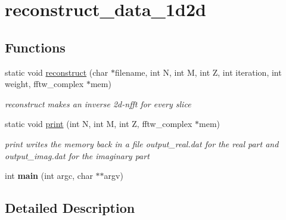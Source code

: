 \hypertarget{group__applications__mri3d__reconstruct__data__1d2d}{\section{reconstruct\-\_\-data\-\_\-1d2d}
\label{group__applications__mri3d__reconstruct__data__1d2d}
}
\subsection*{Functions}
\begin{DoxyCompactItemize}
\item 
\hypertarget{group__applications__mri3d__reconstruct__data__1d2d_gad67335b03b6fec43e0dff3512c8f6d68}{static void \hyperlink{group__applications__mri3d__reconstruct__data__1d2d_gad67335b03b6fec43e0dff3512c8f6d68}{reconstruct} (char $\ast$filename, int N, int M, int Z, int iteration, int weight, fftw\-\_\-complex $\ast$mem)}\label{group__applications__mri3d__reconstruct__data__1d2d_gad67335b03b6fec43e0dff3512c8f6d68}

\begin{DoxyCompactList}\small\item\em reconstruct makes an inverse 2d-\/nfft for every slice \end{DoxyCompactList}\item 
\hypertarget{group__applications__mri3d__reconstruct__data__1d2d_gaa30709aaef018deecdd911083fadb877}{static void \hyperlink{group__applications__mri3d__reconstruct__data__1d2d_gaa30709aaef018deecdd911083fadb877}{print} (int N, int M, int Z, fftw\-\_\-complex $\ast$mem)}\label{group__applications__mri3d__reconstruct__data__1d2d_gaa30709aaef018deecdd911083fadb877}

\begin{DoxyCompactList}\small\item\em print writes the memory back in a file output\-\_\-real.\-dat for the real part and output\-\_\-imag.\-dat for the imaginary part \end{DoxyCompactList}\item 
\hypertarget{group__applications__mri3d__reconstruct__data__1d2d_ga3c04138a5bfe5d72780bb7e82a18e627}{int {\bfseries main} (int argc, char $\ast$$\ast$argv)}\label{group__applications__mri3d__reconstruct__data__1d2d_ga3c04138a5bfe5d72780bb7e82a18e627}

\end{DoxyCompactItemize}


\subsection{Detailed Description}
